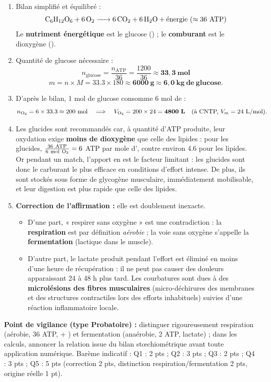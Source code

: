 \documentclass[11pt]{article}
\newcommand{\cle}[1]{{\popxbold\color{popdark}#1}}
\begin{document}
\begin{corrige}
\begin{enumerate}
\item Bilan simplifié et équilibré :
\[ \ce{C6H12O6 + 6 O2 -> 6 CO2 + 6 H2O} + \text{énergie } (\approx 36\ \text{ATP}) \]
Le \textbf{nutriment énergétique} est le glucose () ; le \textbf{comburant} est le dioxygène ().
\item Quantité de glucose nécessaire :
\[ n_{\text{glucose}} = \frac{n_{\mathrm{ATP}}}{36} = \frac{\num{1200}}{36} \approx \mathbf{33,3\ mol} \]
\[ m = n \times M = \num{33,3} \times 180 \approx \mathbf{6000\ g} \approx \mathbf{6,0\ kg\ de\ glucose}. \]
\item D'après le bilan, 1 mol de glucose consomme 6 mol de  :
\[ n_{\ce{O2}} = 6 \times \num{33,3} \approx \num{200}\ \text{mol} \quad\Longrightarrow\quad V_{\ce{O2}} = \num{200} \times \num{24} = \mathbf{4800\ L} \quad (\text{à CNTP, } V_m = \num{24}\ \text{L/mol}). \]
\item Les glucides sont recommandés car, à quantité d'ATP produite, leur oxydation exige \textbf{moins de dioxygène} que celle des lipides : pour les glucides, $\frac{36\ \text{ATP}}{6\ \text{mol}\ \ce{O2}} = 6$ ATP par mole d', contre environ \num{4,6} pour les lipides. Or pendant un match, l'apport en  est le facteur limitant : les glucides sont donc le carburant le plus efficace en conditions d'effort intense. De plus, ils sont stockés sous forme de glycogène musculaire, immédiatement mobilisable, et leur digestion est plus rapide que celle des lipides.
\item \textbf{Correction de l'affirmation :} elle est doublement inexacte.
\begin{itemize}
\item D'une part, « respirer sans oxygène » est une contradiction : la \textbf{respiration} est par définition \emph{aérobie} ; la voie sans oxygène s'appelle la \textbf{fermentation} (lactique dans le muscle).
\item D'autre part, le lactate produit pendant l'effort est éliminé en moins d'une heure de récupération : il ne peut pas causer des douleurs apparaissant 24 à 48 h plus tard. Les \cle{courbatures} sont dues à des \textbf{microlésions des fibres musculaires} (micro-déchirures des membranes et des structures contractiles lors des efforts inhabituels) suivies d'une réaction inflammatoire locale.
\end{itemize}
\end{enumerate}
\textbf{Point de vigilance (type Probatoire) :} distinguer rigoureusement respiration (aérobie, 36 ATP,  + ) et fermentation (anaérobie, 2 ATP, lactate) ; dans les calculs, annoncer la relation issue du bilan stœchiométrique avant toute application numérique. Barème indicatif : Q1 : 2 pts ; Q2 : 3 pts ; Q3 : 2 pts ; Q4 : 3 pts ; Q5 : 5 pts (correction 2 pts, distinction respiration/fermentation 2 pts, origine réelle 1 pt).
\end{corrige}
\end{document}
